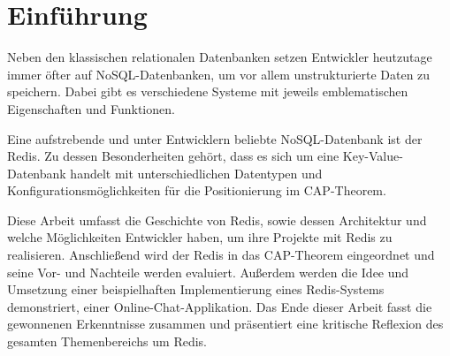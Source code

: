 
\chapter{Einführung}

Neben den klassischen relationalen Datenbanken setzen Entwickler heutzutage immer öfter auf \ac{NoSQL}-Datenbanken, um vor allem unstrukturierte Daten zu speichern. Dabei gibt es verschiedene Systeme mit jeweils emblematischen Eigenschaften und Funktionen. 

Eine aufstrebende und unter Entwicklern beliebte \ac{NoSQL}-Datenbank ist der \ac{Redis}. Zu dessen Besonderheiten gehört, dass es sich um eine Key-Value-Datenbank handelt mit unterschiedlichen Datentypen und Konfigurationsmöglichkeiten für die Positionierung im \acs{CAP}-Theorem.

Diese Arbeit umfasst die Geschichte von \ac{Redis}, sowie dessen Architektur und welche Möglichkeiten Entwickler haben, um ihre Projekte mit \ac{Redis} zu realisieren. Anschließend wird der \acl{Redis} in das \acs{CAP}-Theorem eingeordnet und seine Vor- und Nachteile werden evaluiert. Außerdem werden die Idee und Umsetzung einer beispielhaften Implementierung eines \ac{Redis}-Systems demonstriert, einer Online-Chat-Applikation. Das Ende dieser Arbeit fasst die gewonnenen Erkenntnisse zusammen und präsentiert eine kritische Reflexion des gesamten Themenbereichs um \ac{Redis}.